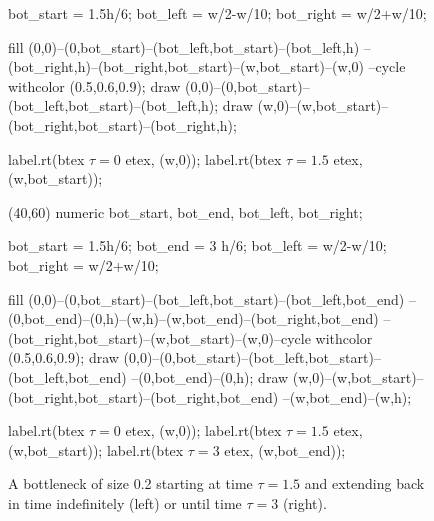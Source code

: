 \documentclass{manual}
\begin{document}
\begin{empfile}
\begin{figure}[t]
\begin{empdef}
    bot_start = 1.5h/6;
    bot_left  = w/2-w/10;
    bot_right = w/2+w/10;
  
    fill (0,0)--(0,bot_start)--(bot_left,bot_start)--(bot_left,h)
         --(bot_right,h)--(bot_right,bot_start)--(w,bot_start)--(w,0)
         --cycle withcolor (0.5,0.6,0.9);%
    draw (0,0)--(0,bot_start)--(bot_left,bot_start)--(bot_left,h);
    draw (w,0)--(w,bot_start)--(bot_right,bot_start)--(bot_right,h);
  
    label.rt(btex $\tau=0$ etex,   (w,0));
    label.rt(btex $\tau=1.5$ etex, (w,bot_start));
  \end{empdef}
  \begin{empdef}(40,60)
    numeric bot_start, bot_end, bot_left, bot_right;

    bot_start = 1.5h/6;
    bot_end   = 3  h/6;
    bot_left  = w/2-w/10;
    bot_right = w/2+w/10;
  
    fill (0,0)--(0,bot_start)--(bot_left,bot_start)--(bot_left,bot_end)
         --(0,bot_end)--(0,h)--(w,h)--(w,bot_end)--(bot_right,bot_end)
         --(bot_right,bot_start)--(w,bot_start)--(w,0)--cycle
         withcolor (0.5,0.6,0.9); %
    draw (0,0)--(0,bot_start)--(bot_left,bot_start)--(bot_left,bot_end)
         --(0,bot_end)--(0,h);
    draw (w,0)--(w,bot_start)--(bot_right,bot_start)--(bot_right,bot_end)
         --(w,bot_end)--(w,h);
  
    label.rt(btex $\tau=0$ etex,   (w,0));
    label.rt(btex $\tau=1.5$ etex, (w,bot_start));
    label.rt(btex $\tau=3$ etex,   (w,bot_end));
  \end{empdef}
  
  \hspace*{.5cm}
  \hfill
  \hspace*{.5cm}

  \caption{A bottleneck of size 0.2 starting at time $\tau=1.5$ and
    extending back in time indefinitely (left) or until time $\tau=3$
    (right).}
  \label{fig:bottlenecks}
\end{figure}


\end{empfile}
\end{document}
